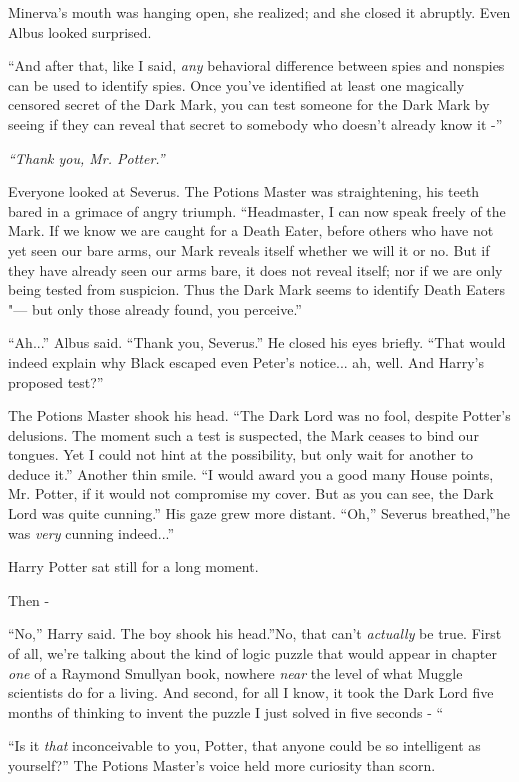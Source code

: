 Minerva's mouth was hanging open, she realized; and she closed it
abruptly. Even Albus looked surprised.

``And after that, like I said, \emph{any} behavioral difference between
spies and nonspies can be used to identify spies. Once you've identified
at least one magically censored secret of the Dark Mark, you can test
someone for the Dark Mark by seeing if they can reveal that secret to
somebody who doesn't already know it -''

\emph{``Thank you, Mr. Potter.''}

Everyone looked at Severus. The Potions Master was straightening, his
teeth bared in a grimace of angry triumph. ``Headmaster, I can now speak
freely of the Mark. If we know we are caught for a Death Eater, before
others who have not yet seen our bare arms, our Mark reveals itself
whether we will it or no. But if they have already seen our arms bare,
it does not reveal itself; nor if we are only being tested from
suspicion. Thus the Dark Mark seems to identify Death Eaters "--- but only
those already found, you perceive.''

``Ah...'' Albus said. ``Thank you, Severus.'' He closed his eyes
briefly. ``That would indeed explain why Black escaped even Peter's
notice... ah, well. And Harry's proposed test?''

The Potions Master shook his head. ``The Dark Lord was no fool, despite
Potter's delusions. The moment such a test is suspected, the Mark ceases
to bind our tongues. Yet I could not hint at the possibility, but only
wait for another to deduce it.'' Another thin smile. ``I would award you
a good many House points, Mr. Potter, if it would not compromise my
cover. But as you can see, the Dark Lord was quite cunning.'' His gaze
grew more distant. ``Oh,'' Severus breathed,''he was \emph{very} cunning
indeed...''

Harry Potter sat still for a long moment.

Then -

``No,'' Harry said. The boy shook his head.''No, that can't
\emph{actually} be true. First of all, we're talking about the kind of
logic puzzle that would appear in chapter \emph{one} of a Raymond
Smullyan book, nowhere \emph{near} the level of what Muggle scientists
do for a living. And second, for all I know, it took the Dark Lord five
months of thinking to invent the puzzle I just solved in five seconds -
``

``Is it \emph{that} inconceivable to you, Potter, that anyone could be so
intelligent as yourself?'' The Potions Master's voice held more
curiosity than scorn.

